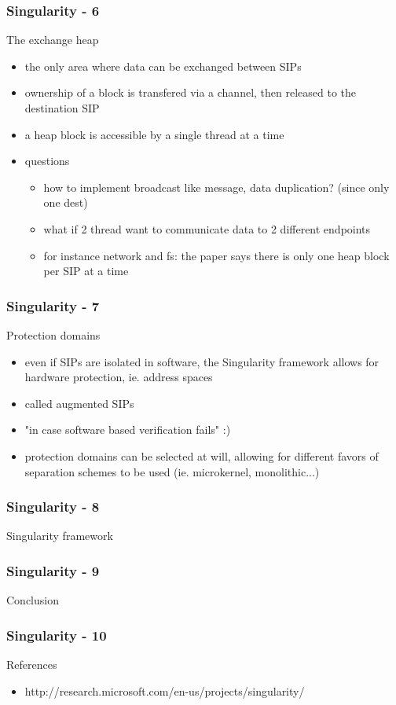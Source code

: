 \begin{frame}
  \frametitle{Singularity - 6}
  The exchange heap
 
 \begin{itemize}
   \item the only area where data can be exchanged between SIPs
   \item ownership of a block is transfered via a channel, then released to the destination SIP
   \item a heap block is accessible by a single thread at a time
   \item questions
     \begin{itemize}
       \item how to implement broadcast like message, data duplication? (since only one dest)
       \item what if 2 thread want to communicate data to 2 different endpoints
       \item for instance network and fs: the paper says there is only one heap block per SIP at a time
     \end{itemize}
 \end{itemize}
\end{frame}


\begin{frame}
  \frametitle{Singularity - 7}
  Protection domains
 
  \begin{itemize}
    \item even if SIPs are isolated in software, the Singularity framework allows for hardware protection, ie. address spaces
    \item called augmented SIPs
    \item "in case software based verification fails" :)
    \item protection domains can be selected at will, allowing for different favors of separation schemes to be used (ie. microkernel, monolithic...)
  \end{itemize}
\end{frame}


\begin{frame}
  \frametitle{Singularity - 8}
  Singularity framework
\end{frame}


\begin{frame}
  \frametitle{Singularity - 9}
  Conclusion
\end{frame}


\begin{frame}
  \frametitle{Singularity - 10}
  References
  \begin{itemize}
    \item http://research.microsoft.com/en-us/projects/singularity/
  \end{itemize}
\end{frame}


